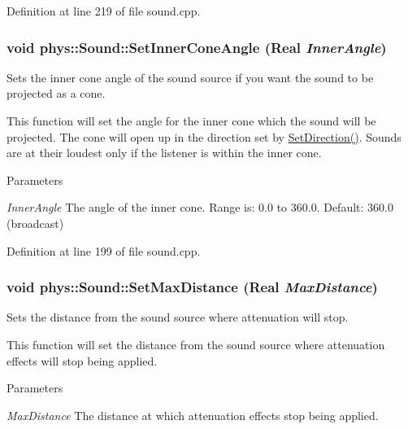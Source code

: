 Definition at line 219 of file sound.cpp.

\hypertarget{classphys_1_1Sound_ae231936d44db727eb48f9ff259ae0dd6}{
\subsubsection[{SetInnerConeAngle}]{\setlength{\rightskip}{0pt plus 5cm}void phys::Sound::SetInnerConeAngle ({\bf Real} {\em InnerAngle})}}
\label{dc/d2f/classphys_1_1Sound_ae231936d44db727eb48f9ff259ae0dd6}


Sets the inner cone angle of the sound source if you want the sound to be projected as a cone. 

This function will set the angle for the inner cone which the sound will be projected. The cone will open up in the direction set by \hyperlink{classphys_1_1Sound_af2d6aa7e1b3b2e9f60b8dbbe8aa2d381}{SetDirection()}. Sounds are at their loudest only if the listener is within the inner cone. 
\begin{DoxyParams}{Parameters}
\item[{\em InnerAngle}]The angle of the inner cone. Range is: 0.0 to 360.0. Default: 360.0 (broadcast) \end{DoxyParams}


Definition at line 199 of file sound.cpp.

\hypertarget{classphys_1_1Sound_a54d04549f0851b00736fdab18a81ec70}{
\subsubsection[{SetMaxDistance}]{\setlength{\rightskip}{0pt plus 5cm}void phys::Sound::SetMaxDistance ({\bf Real} {\em MaxDistance})}}
\label{dc/d2f/classphys_1_1Sound_a54d04549f0851b00736fdab18a81ec70}


Sets the distance from the sound source where attenuation will stop. 

This function will set the distance from the sound source where attenuation effects will stop being applied. 
\begin{DoxyParams}{Parameters}
\item[{\em MaxDistance}]The distance at which attenuation effects stop being applied. \end{DoxyParams}


